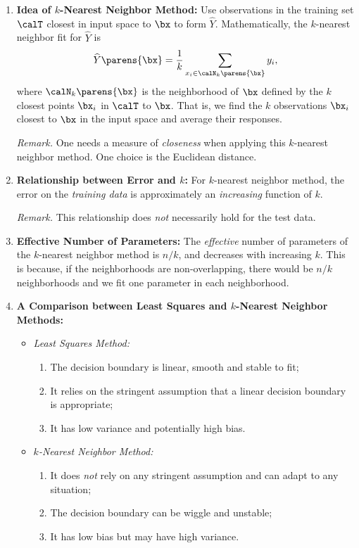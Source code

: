 \documentclass[12pt]{article}
\begin{document}
\begin{enumerate}[label=\textbf{\arabic*.}]
	\item \textbf{Idea of $k$-Nearest Neighbor Method:} Use observations in the training set $\calT$ closest in input space to $\bx$ to form $\widehat{Y}$. Mathematically, the $k$-nearest neighbor fit for $\widehat{Y}$ is 
	\begin{equation}\label{knn}
		\widehat{Y} \parens{\bx} = \frac{1}{k} \sum_{x_i \in \calN_k \parens{\bx}} y_i, 
	\end{equation}
	where $\calN_k \parens{\bx}$ is the neighborhood of $\bx$ defined by the $k$ closest points $\bx_i$ in $\calT$ to $\bx$. That is, we find the $k$ observations $\bx_i$ closest to $\bx$ in the input space and average their responses. 
	
	\textit{Remark.} One needs a measure of \emph{closeness} when applying this $k$-nearest neighbor method. One choice is the Euclidean distance. 
	
	\item \textbf{Relationship between Error and $k$:} For $k$-nearest neighbor method, the error on the \emph{training data} is approximately an \textit{increasing} function of $k$. 
	
	\textit{Remark.} This relationship does \emph{not} necessarily hold for the test data.  
	
	\item \textbf{Effective Number of Parameters:} The \textit{effective} number of parameters of the $k$-nearest neighbor method is $n/k$, and decreases with increasing $k$. This is because, if the neighborhoods are non-overlapping, there would be $n/k$ neighborhoods and we fit one parameter in each neighborhood. 
	
	\item \textbf{A Comparison between Least Squares and $k$-Nearest Neighbor Methods:} 
	\begin{itemize}
		\item \textit{Least Squares Method:} 
		\begin{enumerate}
			\item The decision boundary is linear, smooth and stable to fit; 
			\item It relies on the stringent assumption that a linear decision boundary is appropriate; 
			\item It has low variance and potentially high bias. 
		\end{enumerate}
		
		\item \textit{$k$-Nearest Neighbor Method:}
		\begin{enumerate}
			\item It does \emph{not} rely on any stringent assumption and can adapt to any situation; 
			\item The decision boundary can be wiggle and unstable; 
			\item It has low bias but may have high variance. 
		\end{enumerate}
	\end{itemize}
\end{enumerate}
\end{document}
